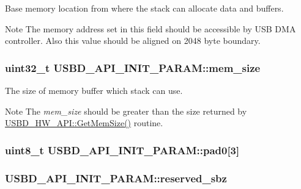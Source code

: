 Base memory location from where the stack can allocate data and buffers. \begin{DoxyNote}{Note}
The memory address set in this field should be accessible by U\-S\-B D\-M\-A controller. Also this value should be aligned on 2048 byte boundary. 
\end{DoxyNote}
\hypertarget{structUSBD__API__INIT__PARAM_a237d34b2303d35b80c7ebb9c58326bf9}{
\subsubsection[{mem\-\_\-size}]{\setlength{\rightskip}{0pt plus 5cm}uint32\-\_\-t U\-S\-B\-D\-\_\-\-A\-P\-I\-\_\-\-I\-N\-I\-T\-\_\-\-P\-A\-R\-A\-M\-::mem\-\_\-size}}\label{structUSBD__API__INIT__PARAM_a237d34b2303d35b80c7ebb9c58326bf9}
The size of memory buffer which stack can use. \begin{DoxyNote}{Note}
The {\itshape mem\-\_\-size} should be greater than the size returned by \hyperlink{structUSBD__HW__API_a59a65bd037723d735b684c308d99fc54}{U\-S\-B\-D\-\_\-\-H\-W\-\_\-\-A\-P\-I\-::\-Get\-Mem\-Size()} routine. 
\end{DoxyNote}
\hypertarget{structUSBD__API__INIT__PARAM_ab537ed0a84e63aaf79592e8bd500c79c}{
\subsubsection[{pad0}]{\setlength{\rightskip}{0pt plus 5cm}uint8\-\_\-t U\-S\-B\-D\-\_\-\-A\-P\-I\-\_\-\-I\-N\-I\-T\-\_\-\-P\-A\-R\-A\-M\-::pad0\mbox{[}3\mbox{]}}}\label{structUSBD__API__INIT__PARAM_ab537ed0a84e63aaf79592e8bd500c79c}
\hypertarget{structUSBD__API__INIT__PARAM_a8470d3c0f29b31408ffa46dd4a4bd74a}{
\subsubsection[{reserved\-\_\-sbz}]{ U\-S\-B\-D\-\_\-\-A\-P\-I\-\_\-\-I\-N\-I\-T\-\_\-\-P\-A\-R\-A\-M\-::reserved\-\_\-sbz}}\label{structUSBD__API__INIT__PARAM_a8470d3c0f29b31408ffa46dd4a4bd74a}
